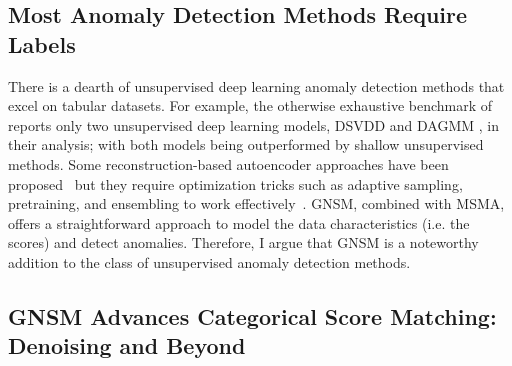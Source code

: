 


\subsection*{Most Anomaly Detection Methods Require Labels}

There is a dearth of unsupervised deep learning anomaly detection methods that excel on tabular datasets. For example, the otherwise exhaustive benchmark of~\cite{han2022adbench} reports only two unsupervised deep learning models, DSVDD \cite{pmlr-v80-ruff18a} and DAGMM \cite{zong2018deep}, in their analysis; with both models being outperformed by shallow unsupervised methods. Some reconstruction-based autoencoder approaches have been proposed~\cite{hawkins2002outlier} but they require optimization tricks such as adaptive sampling, pretraining, and ensembling to work effectively~\cite{chen2017outlier}. 
GNSM, combined with MSMA, offers a straightforward approach to model the data characteristics (i.e. the scores) and detect anomalies. Therefore, I argue that GNSM is a noteworthy addition to the class of unsupervised anomaly detection methods.

\subsection*{GNSM Advances Categorical Score Matching: Denoising and Beyond}

